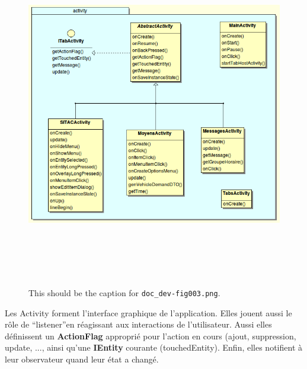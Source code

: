 \documentclass{article}
\begin{document}
\begin{figure}[htbp]
\begin{center}
\includegraphics[width=499pt, height=433pt]{doc_dev-fig003.png}
\caption{This should be the caption for \texttt{doc\_dev-fig003.png}.}
\end{center}
\end{figure}


Les Activity forment l'interface graphique de l'application. Elles 
jouent aussi le rôle de ``listener''en réagissant aux interactions de l'utilisateur. 
Aussi elles définissent un \textbf{ActionFlag}
approprié pour l'action en cours (ajout, suppression, update, ..., ainsi qu'une 
\textbf{IEntity} courante (touchedEntity). Enfin, elles notifient à leur observateur quand leur état a changé.
\end{document}
